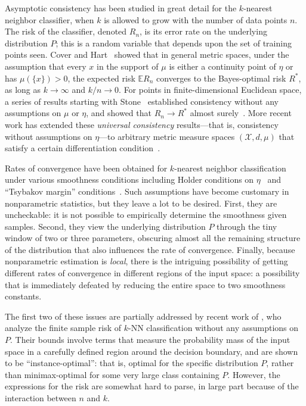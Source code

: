 \documentclass{article}
\def\E{{\mathbb E}}
\def\X{{\mathcal X}}
\begin{document}
Asymptotic consistency has been studied in great detail for the $k$-nearest neighbor classifier, when $k$ is allowed to grow with the number of data points $n$. The risk of the classifier, denoted $R_n$, is its error rate on the underlying distribution $P$; this is a random variable that depends upon the set of training points seen. Cover and Hart~\cite{CH67} showed that in general metric spaces, under the assumption that every $x$ in the support of $\mu$ is either a continuity point of $\eta$ or has $\mu(\{x\}) > 0$, the expected risk $\E R_n$ converges to the Bayes-optimal risk $R^*$, as long as $k \rightarrow \infty$ and $k/n \rightarrow 0$. For points in finite-dimensional Euclidean space, a series of results starting with Stone~\cite{S77} established consistency without any assumptions on $\mu$ or $\eta$, and showed that $R_n \rightarrow R^*$ almost surely~\cite{DGKL94}. More recent work has extended these {\it universal consistency} results---that is, consistency without assumptions on $\eta$---to arbitrary metric measure spaces $(\X, d, \mu)$ that satisfy a certain differentiation condition~\cite{CG06,ChaudhuriDasgupta2014}.

Rates of convergence have been obtained for $k$-nearest neighbor classification under various smoothness conditions including Holder conditions on $\eta$~\cite{KP95,G81} and ``Tsybakov margin'' conditions~\cite{MT99,AT07,ChaudhuriDasgupta2014}. Such assumptions have become customary in nonparametric statistics, but they leave a lot to be desired. First, they are uncheckable: it is not possible to empirically determine the smoothness given samples. Second, they view the underlying distribution $P$ through the tiny window of two or three parameters, obscuring almost all the remaining structure of the distribution that also influences the rate of convergence. Finally, because nonparametric estimation is {\it local}, there is the intriguing possibility of getting different rates of convergence in different regions of the input space: a possibility that is immediately defeated by reducing the entire space to two smoothness constants.

The first two of these issues are partially addressed by recent work of \cite{ChaudhuriDasgupta2014}, who analyze the finite sample risk of $k$-NN classification without any assumptions on $P$. Their bounds involve terms that measure the probability mass of the input space in a carefully defined region around the decision boundary, and are shown to be ``instance-optimal'': that is, optimal for the specific distribution $P$, rather than minimax-optimal for some very large class containing $P$. However, the expressions for the risk are somewhat hard to parse, in large part because of the interaction between $n$ and $k$.
\end{document}
